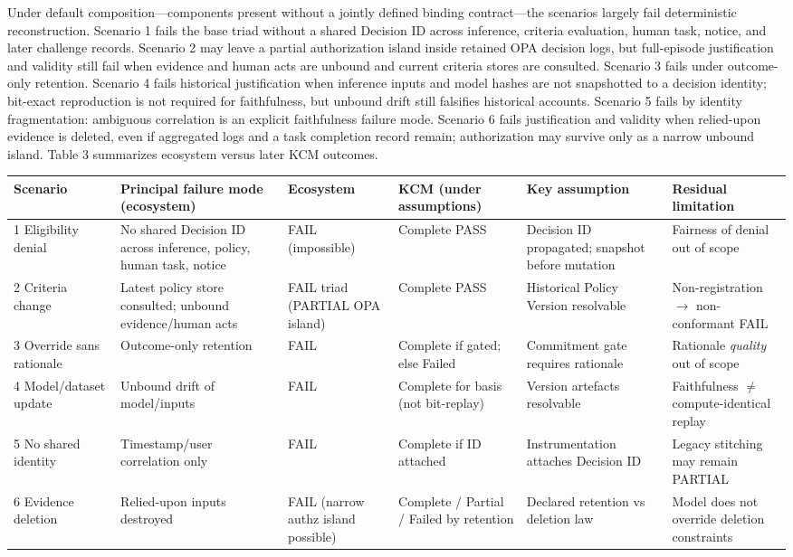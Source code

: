 \documentclass[11pt,a4paper]{article}
\begin{document}
Under default composition---components present without a jointly defined binding contract---the scenarios largely fail deterministic reconstruction. Scenario 1 fails the base triad without a shared Decision ID across inference, criteria evaluation, human task, notice, and later challenge records. Scenario 2 may leave a partial authorization island inside retained OPA decision logs, but full-episode justification and validity still fail when evidence and human acts are unbound and current criteria stores are consulted. Scenario 3 fails under outcome-only retention. Scenario 4 fails historical justification when inference inputs and model hashes are not snapshotted to a decision identity; bit-exact reproduction is not required for faithfulness, but unbound drift still falsifies historical accounts. Scenario 5 fails by identity fragmentation: ambiguous correlation is an explicit faithfulness failure mode. Scenario 6 fails justification and validity when relied-upon evidence is deleted, even if aggregated logs and a task completion record remain; authorization may survive only as a narrow unbound island. Table 3 summarizes ecosystem versus later KCM outcomes.




\begin{table}[t]
\centering
\small
\begin{tabularx}{\textwidth}{|X|X|X|X|X|X|}
\hline
 Scenario & Principal failure mode (ecosystem) & Ecosystem & KCM (under assumptions) & Key assumption & Residual limitation \\
 \hline
 \hline
 1 Eligibility denial & No shared Decision ID across inference, policy, human task, notice & FAIL (impossible) & Complete PASS & Decision ID propagated; snapshot before mutation & Fairness of denial out of scope \\
 \hline
 2 Criteria change & Latest policy store consulted; unbound evidence/human acts & FAIL triad (PARTIAL OPA island) & Complete PASS & Historical Policy Version resolvable & Non-registration $\rightarrow$ non-conformant FAIL \\
 \hline
 3 Override sans rationale & Outcome-only retention & FAIL & Complete if gated; else Failed & Commitment gate requires rationale & Rationale \emph{quality} out of scope \\
 \hline
 4 Model/dataset update & Unbound drift of model/inputs & FAIL & Complete for basis (not bit-replay) & Version artefacts resolvable & Faithfulness $\neq$ compute-identical replay \\
 \hline
 5 No shared identity & Timestamp/user correlation only & FAIL & Complete if ID attached & Instrumentation attaches Decision ID & Legacy stitching may remain PARTIAL \\
 \hline
 6 Evidence deletion & Relied-upon inputs destroyed & FAIL (narrow authz island possible) & Complete / Partial / Failed by retention & Declared retention vs deletion law & Model does not override deletion constraints \\
 \hline
\end{tabularx}
\end{table}
\end{document}
